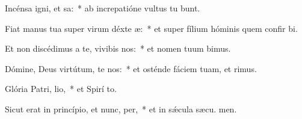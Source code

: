 \item Incénsa igni, et sa:~* ab increpatióne vultus tu bunt.
\item Fiat manus tua super virum déxte æ:~* et super fílium hóminis quem confir bi.
\item Et non discédimus a te, vivibis nos:~* et nomen tuum bimus.
\item Dómine, Deus virtútum, te nos:~* et osténde fáciem tuam, et  rimus.
\item Glória Patri,  lio,~* et Spirí to.
\item Sicut erat in princípio, et nunc,  per,~* et in sǽcula sæcu. men.
